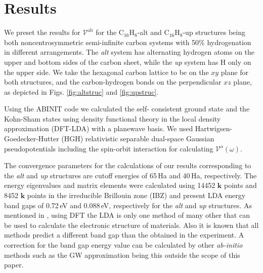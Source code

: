 \documentclass[twocolumn]{article}
\let\Oldsection\section
\renewcommand{\section}{\FloatBarrier\Oldsection}
\begin{document}

\section{Results} %
\label{sec:results}


We preset the results for $\mathcal{V}^{\mathrm{ab}}$ for the
C$_{16}$H$_{8}$-alt and C$_{16}$H$_{8}$-up structures being both
noncentrosymmetric semi-infinite carbon systems with 50\% hydrogenation in
different arrangements. The \emph{alt} system has alternating hydrogen atoms on
the upper and bottom sides of the carbon sheet, while the \emph{up} system has H
only on the upper side. We take the hexagonal carbon lattice to be on the $xy$
plane for both structures, and the carbon-hydrogen bonds on the perpendicular
$xz$ plane, as depicted in Figs.
\ref{fig:altstruc} and \ref{fig:upstruc}.

Using the ABINIT code \cite{gonzeCPC09} we calculated the self- consistent
ground state and the Kohn-Sham states using density functional theory in the
local density approximation (DFT-LDA) with a planewave basis. We used
Hartwigsen- Goedecker-Hutter (HGH) relativistic separable dual-space Gaussian
pseudopotentials \cite{hartwigsenPRB98} including the spin-orbit interaction for
calculating $\mathcal{V}^{\mathrm{a}}(\omega)$.

The convergence parameters for the calculations of our results corresponding to
the \emph{alt} and \emph{up} structures are cutoff energies of 65\,Ha and
40\,Ha, respectively. The energy eigenvalues and matrix elements were calculated
using 14452 $\mathbf{k}$ points and 8452 $\mathbf{k}$ points in the irreducible
Brillouin zone (IBZ) and present LDA energy band gaps of 0.72\,eV and 0.088\,eV,
respectively for the \emph{alt} and \emph{up} structures. As mentioned in
\cite{zapataPSB2016}, using DFT the LDA is only one method of many other that
can be used to calculate the electronic structure of materials. Also it is known
that all methods predict a different band gap than the obtained in the
experiment. A correction for the band gap energy value can be calculated by
other \emph{ab-initio} methods such as the GW approximation \cite{onidaRMP02}
being this outside the scope of this paper.
\end{document}
